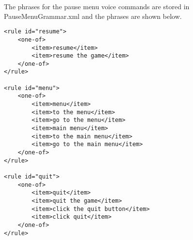 \documentclass{article}
\begin{document}
The phrases for the pause menu voice commands are stored in PauseMenuGrammar.xml and the phrases are shown below.
\begin{verbatim}
<rule id="resume">
    <one-of>
        <item>resume</item>
        <item>resume the game</item>
    </one-of>
</rule>

<rule id="menu">
    <one-of>
        <item>menu</item>
        <item>to the menu</item>
        <item>go to the menu</item>
        <item>main menu</item>
        <item>to the main menu</item>
        <item>go to the main menu</item>
    </one-of>
</rule>

<rule id="quit">
    <one-of>
        <item>quit</item>
        <item>quit the game</item>
        <item>click the quit button</item>
        <item>click quit</item>
    </one-of>
</rule>
\end{verbatim}
\end{document}
